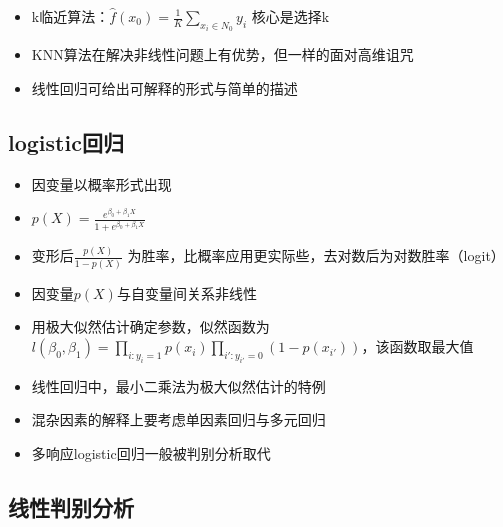 \documentclass[
]{book}
\providecommand{\tightlist}{%
  \setlength{\itemsep}{0pt}\setlength{\parskip}{0pt}}
\begin{document}
\begin{itemize}
\tightlist
\item
  k临近算法：\(\hat f(x_0) = \frac{1}{K} \sum_{x_i \in N_0} y_i\) 核心是选择k
\item
  KNN算法在解决非线性问题上有优势，但一样的面对高维诅咒
\item
  线性回归可给出可解释的形式与简单的描述
\end{itemize}

\hypertarget{logisticux56deux5f52}{%
\subsection{logistic回归}\label{logisticux56deux5f52}}

\begin{itemize}
\tightlist
\item
  因变量以概率形式出现
\item
  \(p(X) = \frac {e^{\beta_0 + \beta_1 X}}{1 + e^{\beta_0 + \beta_1 X}}\)
\item
  变形后\(\frac {p(X)}{1 - p(X)}\) 为胜率，比概率应用更实际些，去对数后为对数胜率（logit）
\item
  因变量\(p(X)\)与自变量间关系非线性
\item
  用极大似然估计确定参数，似然函数为\(l(\beta_0, \beta_1) = \prod_{i:y_i = 1} p(x_i)\prod_{i':y_{i'} = 0} (1 - p(x_{i'}))\)，该函数取最大值
\item
  线性回归中，最小二乘法为极大似然估计的特例
\item
  混杂因素的解释上要考虑单因素回归与多元回归
\item
  多响应logistic回归一般被判别分析取代
\end{itemize}

\hypertarget{ux7ebfux6027ux5224ux522bux5206ux6790}{%
\subsection{线性判别分析}\label{ux7ebfux6027ux5224ux522bux5206ux6790}}
\end{document}
